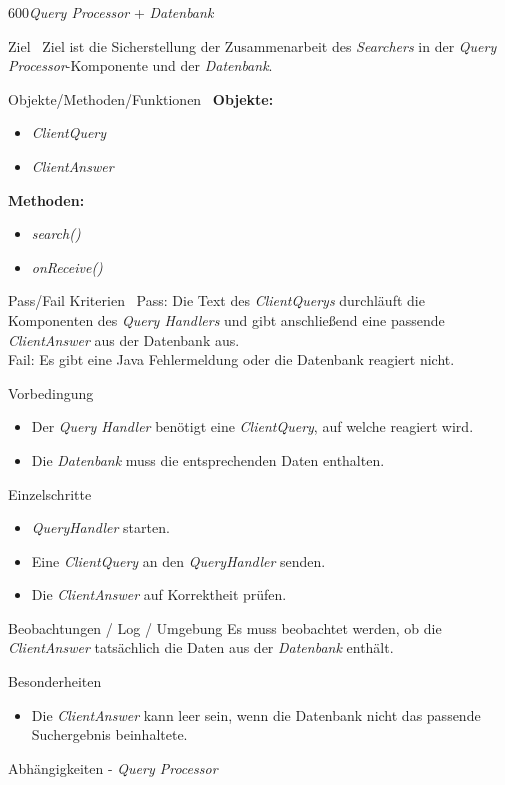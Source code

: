 \begin{testcase}{600}{\textit{Query Processor} + \textit{Datenbank}}

\item[Ziel]\
Ziel ist die Sicherstellung der Zusammenarbeit des
\textit{Searchers} in der \textit{Query Processor}-Komponente und der
\textit{Datenbank}.
\item[Objekte/Methoden/Funktionen]\
\textbf{Objekte: }
\begin{itemize}
\item \textit{ClientQuery}
\item \textit{ClientAnswer}
\end{itemize}

\textbf{Methoden: }
\begin{itemize}
\item \textit{search()}
\item \textit{onReceive()}
\end{itemize}
\item[Pass/Fail Kriterien]\
Pass: Die Text des \textit{ClientQuerys} durchläuft die Komponenten des
\textit{Query Handlers} und gibt anschließend eine passende
\textit{ClientAnswer} aus der Datenbank aus.\\
Fail: Es gibt eine Java Fehlermeldung oder die Datenbank reagiert nicht.

\item[Vorbedingung]
\begin{itemize} 
\item Der \textit{Query Handler} benötigt eine \textit{ClientQuery}, auf welche
reagiert wird.
\item Die \textit{Datenbank} muss die entsprechenden Daten enthalten.
\end{itemize}
\item[Einzelschritte]
\begin{itemize}
\item \textit{QueryHandler} starten. 
\item Eine \textit{ClientQuery} an den \textit{QueryHandler} senden.
\item Die \textit{ClientAnswer} auf Korrektheit prüfen.
\end{itemize} 
\item[Beobachtungen / Log / Umgebung]
Es muss beobachtet werden, ob die \textit{ClientAnswer} tatsächlich die Daten
aus der \textit{Datenbank} enthält.
\item[Besonderheiten]
\begin{itemize}
\item Die \textit{ClientAnswer} kann leer sein, wenn die Datenbank nicht das
passende Suchergebnis beinhaltete.
\end{itemize}
\item[Abhängigkeiten] -
\textit{Query Processor}

\end{testcase}

